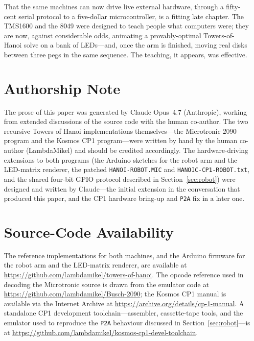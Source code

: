 \documentclass[11pt,a4paper]{article}
\begin{document}
That the same machines can now drive live external hardware, through a
fifty-cent serial protocol to a five-dollar microcontroller, is a
fitting late chapter. The TMS1600 and the 8049 were designed to teach
people what computers were; they are now, against considerable odds,
animating a provably-optimal Towers-of-Hanoi solve on a bank of
LEDs---and, once the arm is finished, moving real disks between three
pegs in the same sequence. The teaching, it appears, was effective.

\section*{Authorship Note}

The prose of this paper was generated by Claude Opus~4.7 (Anthropic),
working from extended discussions of the source code with the
human co-author. The two recursive Towers of Hanoi
implementations themselves---the Microtronic 2090 program and the
Kosmos CP1 program---were written by hand by the human co-author
(LambdaMikel) and should be credited accordingly. The hardware-driving
extensions to both programs (the Arduino sketches for the robot arm and
the LED-matrix renderer, the patched \texttt{HANOI-ROBOT.MIC} and
\texttt{HANOIC-CP1-ROBOT.txt}, and the shared four-bit GPIO protocol
described in Section~\ref{sec:robot}) were designed and written by
Claude---the initial extension in the conversation that produced this
paper, and the CP1 hardware bring-up and \texttt{P2A} fix in a later
one.

\appendix

\section{Source-Code Availability}

The reference implementations for both machines, and the Arduino
firmware for the robot arm and the LED-matrix renderer, are available at
\url{https://github.com/lambdamikel/towers-of-hanoi}. The opcode
reference used in decoding the Microtronic source is drawn from the
emulator code at \url{https://github.com/lambdamikel/Busch-2090}; the
Kosmos CP1 manual is available via the Internet Archive at
\url{https://archive.org/details/cp-1-manual}. A standalone CP1
development toolchain---assembler, cassette-tape tools, and the
emulator used to reproduce the \texttt{P2A} behaviour discussed in
Section~\ref{sec:robot}---is at
\url{https://github.com/lambdamikel/kosmos-cp1-devel-toolchain}.
\end{document}
